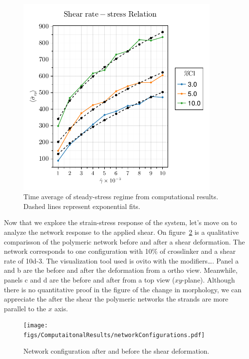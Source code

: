 \begin{figure}[ht!]
    \centering
    \includegraphics[width=0.9\textwidth]{figs/ComputaitonalResults/yieldStress.pdf}
    \caption{Time average of steady-stress regime from computational results. Dashed lines represent exponential fits.}\label{fig:yieldStressResults}
\end{figure}


Now that we explore the strain-stress response of the system, let's move on to analyze the network response to the applied shear.
On figure~\ref{fig:network1} is a qualitative comparisson of the polymeric network before and after a shear deformation.
The network corresponds to one configuration with \num{10}\% of crosslinker and a shear rate of \num{10d-3}.
The visualization tool used is ovito with the modifiers\ldots.
Panel a and b are the before and after the deformation from a ortho view.
Meanwhile, panels c and d are the before and after from a top view ($xy$-plane).
Although there is no quantitative proof in the figure of the change in morphology, we can appreciate the after the shear the polymeric networks the strands are more parallel to the $x$ axis.

\begin{figure}[ht!]
    \centering
    \texttt{[image: figs/ComputaitonalResults/networkConfigurations.pdf]}
    \caption{Network configuration after and before the shear deformation.}\label{fig:network1}
\end{figure}


